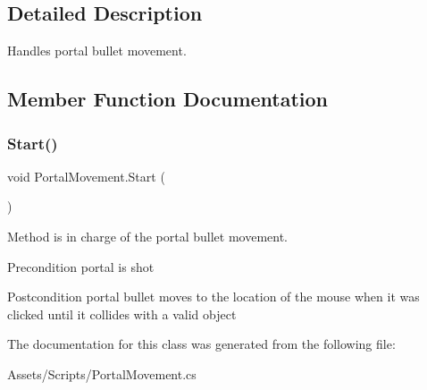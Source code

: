 \subsection{Detailed Description}
Handles portal bullet movement. 

\subsection{Member Function Documentation}
\mbox{\label{class_portal_movement_aa7beca3afea663ec0de74142ac852ca4}} 
\subsubsection{\texorpdfstring{Start()}{Start()}}
{\footnotesize\ttfamily void Portal\+Movement.\+Start (\begin{DoxyParamCaption}{ }\end{DoxyParamCaption})\hspace{0.3cm}{\ttfamily [inline]}}

Method is in charge of the portal bullet movement. \begin{DoxyPrecond}{Precondition}
portal is shot 
\end{DoxyPrecond}
\begin{DoxyPostcond}{Postcondition}
portal bullet moves to the location of the mouse when it was clicked until it collides with a valid object 
\end{DoxyPostcond}


The documentation for this class was generated from the following file\+:\begin{DoxyCompactItemize}
\item 
Assets/\+Scripts/Portal\+Movement.\+cs\end{DoxyCompactItemize}
